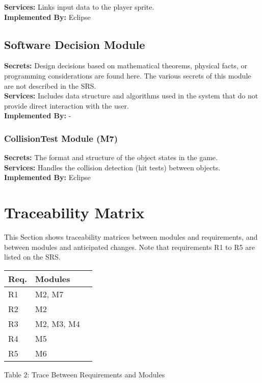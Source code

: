 \documentclass[12pt, letterpaper]{article}
\begin{document}
	\noindent \textbf{Services:} Links input data to the player sprite.\\
	
	\noindent \textbf{Implemented By:} Eclipse
	
	\subsection{Software Decision Module}
	\noindent \textbf{Secrets:} Design decisions based on mathematical theorems, physical facts, \indent or programming considerations are found here. The various secrets of this \indent module are not described in the SRS.\\
	
	\noindent \textbf{Services:} Includes data structure and algorithms used in the system that \indent do not provide direct interaction with the user.\\
	
	\noindent \textbf{Implemented By:} -
	
	\subsubsection{CollisionTest Module (M7)}
	\noindent \textbf{Secrets:} The format and structure of the object states in the game.\\
	
	\noindent \textbf{Services:} Handles the collision detection (hit tests) between objects.\\
	
	\noindent \textbf{Implemented By:} Eclipse
	
	\section{Traceability Matrix}
	This Section shows traceability matrices between modules and requirements, and between modules and anticipated changes. Note that requirements R1 to R5 are listed on the SRS.
		\begin{center}
			\begin{tabular}{ p{6cm} p{4cm} p{4cm}  }
				\hline
				Req. & Modules &\\ 
				\hline
				R1  & M2, M7 & \\ 
				R2  & M2 & \\
				R3  & M2, M3, M4 & \\
				R4  & M5 & \\
				R5  & M6 & \\
				\hline
				
			\end{tabular}				
			\footnotesize Table 2: Trace Between Requirements and Modules
		\end{center}
		
\end{document}
